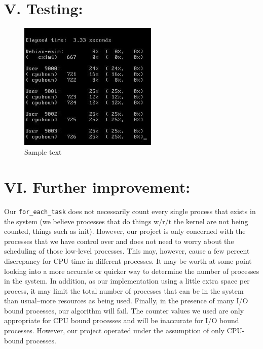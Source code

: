 \documentclass[10pt]{article}
\begin{document}
\section{V. Testing:}
\begin{figure}[H]
 \caption{Sample text}
 \centering
 \includegraphics[width=250px]{incsharemonitor.jpg}
\end{figure}


\section{VI. Further improvement:}

Our \texttt{for\_each\_task} does not necessarily count every single process that exists in the system (we believe processes that do things w/r/t the kernel are not being counted, things such as init). However, our project is only concerned with the processes that we have control over and does not need to worry about the scheduling of those low-level processes. This may, however, cause a few percent discrepancy for CPU time in different processes. It may be worth at some point looking into a more accurate or quicker way to determine the number of processes in the system. In addition, as our implementation using a little extra space per process, it may limit the total number of processes that can be in the system than usual--more resources as being used. Finally, in the presence of many I/O bound processes, our algorithm will fail. The counter values we used are only appropriate for CPU bound processes and will be inaccurate for I/O bound processes. However, our project operated under the assumption of only CPU-bound processes.
\end{document}

